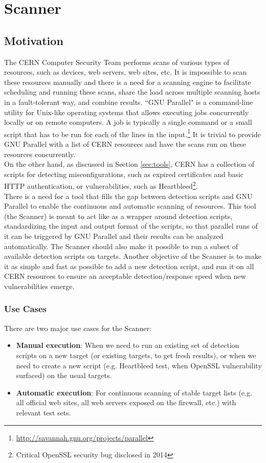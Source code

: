 \chapter{Scanner}
\label{scanner}
\thispagestyle{empty}

\section{Motivation}
\label{scanner_motivation}
The CERN Computer Security Team performs scans of various types of resources, such as devices, web servers, web sites, etc. It is impossible to scan these resources manually and there is a need for a scanning engine to facilitate scheduling and running these scans, share the load across multiple scanning hosts in a fault-tolerant way, and combine results.
``GNU Parallel" is a command-line utility for Unix-like operating systems that allows executing jobs concurrently locally or on remote computers. A job is typically a single command or a small script that has to be run for each of the lines in the input.\footnote{\url{http://savannah.gnu.org/projects/parallel}} It is trivial to provide GNU Parallel with a list of CERN resources and have the scans run on these resources concurrently.
\\ 
On the other hand, as discussed in Section \ref{sec:tools}, CERN has a collection of scripts for detecting misconfigurations, such as expired certificates and basic HTTP authentication, or vulnerabilities, such as Heartbleed\footnote{Critical OpenSSL security bug disclosed in 2014}. 
\\
There is a need for a tool that fills the gap between detection scripts and GNU Parallel to enable the continuous and automatic scanning of resources. This tool (the Scanner) is meant to act like as a wrapper around detection scripts, standardizing the input and output format of the scripts, so that parallel runs of it can be triggered by GNU Parallel and their results can be analyzed automatically. The Scanner should also make it possible to run a subset of available detection scripts on targets. Another objective of the Scanner is to make it as simple and fast as possible to add a new detection script, and run it on all CERN resources to ensure an acceptable detection/response speed when new vulnerabilities emerge.

\subsection{Use Cases}
There are two major use cases for the Scanner:
\begin{itemize}
\item \textbf{Manual execution}: When we need to run an existing set of detection scripts on a new target (or existing targets, to get fresh results), or when we need to create a new script (e.g. Heartbleed test, when OpenSSL vulnerability surfaced) on the usual targets.
\item \textbf{Automatic execution}: For continuous scanning of stable target lists (e.g. all official web sites, all web servers exposed on the firewall, etc.) with relevant test sets.
\end{itemize}

